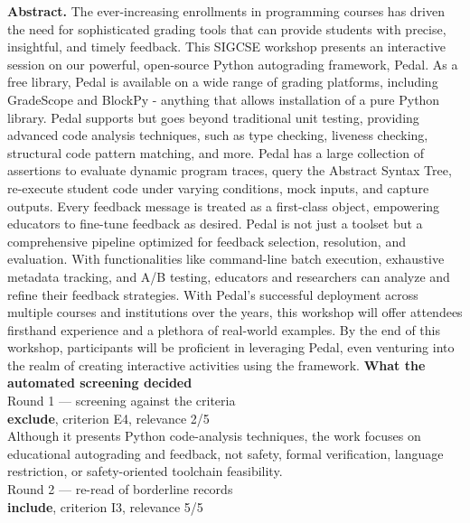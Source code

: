 \documentclass[11pt,a4paper]{article}
\begin{document}
{\small\textbf{Abstract.} The ever-increasing enrollments in programming courses has driven the need for sophisticated grading tools that can provide students with precise, insightful, and timely feedback. This SIGCSE workshop presents an interactive session on our powerful, open-source Python autograding framework, Pedal. As a free library, Pedal is available on a wide range of grading platforms, including GradeScope and BlockPy - anything that allows installation of a pure Python library. Pedal supports but goes beyond traditional unit testing, providing advanced code analysis techniques, such as type checking, liveness checking, structural code pattern matching, and more. Pedal has a large collection of assertions to evaluate dynamic program traces, query the Abstract Syntax Tree, re-execute student code under varying conditions, mock inputs, and capture outputs. Every feedback message is treated as a first-class object, empowering educators to fine-tune feedback as desired. Pedal is not just a toolset but a comprehensive pipeline optimized for feedback selection, resolution, and evaluation. With functionalities like command-line batch execution, exhaustive metadata tracking, and A/B testing, educators and researchers can analyze and refine their feedback strategies. With Pedal's successful deployment across multiple courses and institutions over the years, this workshop will offer attendees firsthand experience and a plethora of real-world examples. By the end of this workshop, participants will be proficient in leveraging Pedal, even venturing into the realm of creating interactive activities using the framework.}
\vspace{3mm}
\vspace{2.5mm}
{\small\textbf{What the automated screening decided}}\\[2mm]
{\footnotesize\color{soft}Round 1 --- screening against the criteria}\\[0.5mm]
{\small\textbf{exclude}, criterion E4, relevance 2/5}\\[0.5mm]
{\small Although it presents Python code-analysis techniques, the work focuses on educational autograding and feedback, not safety, formal verification, language restriction, or safety-oriented toolchain feasibility.}\\[2.5mm]
{\footnotesize\color{soft}Round 2 --- re-read of borderline records}\\[0.5mm]
{\small\textbf{include}, criterion I3, relevance 5/5}\\[0.5mm]
\end{document}
